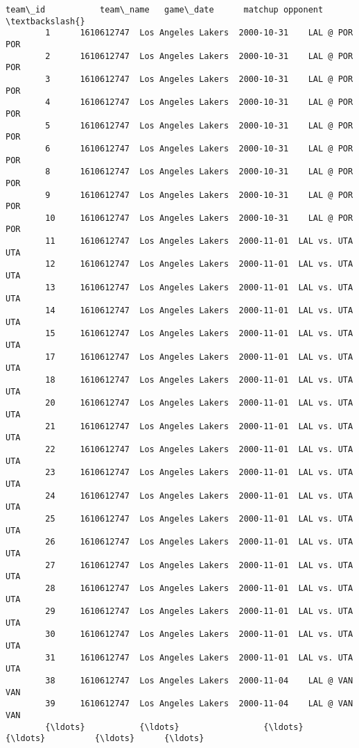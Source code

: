 \documentclass[11pt]{article}
\begin{document}
\begin{Verbatim}[commandchars=\\\{\}]
                  team\_id           team\_name   game\_date      matchup opponent  \textbackslash{}
        1      1610612747  Los Angeles Lakers  2000-10-31    LAL @ POR      POR   
        2      1610612747  Los Angeles Lakers  2000-10-31    LAL @ POR      POR   
        3      1610612747  Los Angeles Lakers  2000-10-31    LAL @ POR      POR   
        4      1610612747  Los Angeles Lakers  2000-10-31    LAL @ POR      POR   
        5      1610612747  Los Angeles Lakers  2000-10-31    LAL @ POR      POR   
        6      1610612747  Los Angeles Lakers  2000-10-31    LAL @ POR      POR   
        8      1610612747  Los Angeles Lakers  2000-10-31    LAL @ POR      POR   
        9      1610612747  Los Angeles Lakers  2000-10-31    LAL @ POR      POR   
        10     1610612747  Los Angeles Lakers  2000-10-31    LAL @ POR      POR   
        11     1610612747  Los Angeles Lakers  2000-11-01  LAL vs. UTA      UTA   
        12     1610612747  Los Angeles Lakers  2000-11-01  LAL vs. UTA      UTA   
        13     1610612747  Los Angeles Lakers  2000-11-01  LAL vs. UTA      UTA   
        14     1610612747  Los Angeles Lakers  2000-11-01  LAL vs. UTA      UTA   
        15     1610612747  Los Angeles Lakers  2000-11-01  LAL vs. UTA      UTA   
        17     1610612747  Los Angeles Lakers  2000-11-01  LAL vs. UTA      UTA   
        18     1610612747  Los Angeles Lakers  2000-11-01  LAL vs. UTA      UTA   
        20     1610612747  Los Angeles Lakers  2000-11-01  LAL vs. UTA      UTA   
        21     1610612747  Los Angeles Lakers  2000-11-01  LAL vs. UTA      UTA   
        22     1610612747  Los Angeles Lakers  2000-11-01  LAL vs. UTA      UTA   
        23     1610612747  Los Angeles Lakers  2000-11-01  LAL vs. UTA      UTA   
        24     1610612747  Los Angeles Lakers  2000-11-01  LAL vs. UTA      UTA   
        25     1610612747  Los Angeles Lakers  2000-11-01  LAL vs. UTA      UTA   
        26     1610612747  Los Angeles Lakers  2000-11-01  LAL vs. UTA      UTA   
        27     1610612747  Los Angeles Lakers  2000-11-01  LAL vs. UTA      UTA   
        28     1610612747  Los Angeles Lakers  2000-11-01  LAL vs. UTA      UTA   
        29     1610612747  Los Angeles Lakers  2000-11-01  LAL vs. UTA      UTA   
        30     1610612747  Los Angeles Lakers  2000-11-01  LAL vs. UTA      UTA   
        31     1610612747  Los Angeles Lakers  2000-11-01  LAL vs. UTA      UTA   
        38     1610612747  Los Angeles Lakers  2000-11-04    LAL @ VAN      VAN   
        39     1610612747  Los Angeles Lakers  2000-11-04    LAL @ VAN      VAN   
        {\ldots}           {\ldots}                 {\ldots}         {\ldots}          {\ldots}      {\ldots}   

\end{Verbatim}
\end{document}
